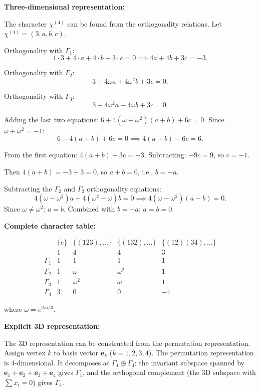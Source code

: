 \documentclass[12pt]{article}
\begin{document}
\medskip
\noindent\textbf{Three-dimensional representation:}

The character $\chi^{(4)}$ can be found from the orthogonality relations. Let $\chi^{(4)} = (3, a, b, c)$.

Orthogonality with $\Gamma_1$:
\[
1\cdot 3 + 4\cdot a + 4\cdot b + 3\cdot c = 0 \implies 4a + 4b + 3c = -3.
\]

Orthogonality with $\Gamma_2$:
\[
3 + 4\omega a + 4\omega^2 b + 3c = 0.
\]

Orthogonality with $\Gamma_3$:
\[
3 + 4\omega^2 a + 4\omega b + 3c = 0.
\]

Adding the last two equations: $6 + 4(\omega + \omega^2)(a + b) + 6c = 0$. Since $\omega + \omega^2 = -1$:
\[
6 - 4(a + b) + 6c = 0 \implies 4(a+b) - 6c = 6.
\]

From the first equation: $4(a+b) + 3c = -3$. Subtracting: $-9c = 9$, so $c = -1$.

Then $4(a+b) = -3 + 3 = 0$, so $a + b = 0$, i.e., $b = -a$.

Subtracting the $\Gamma_2$ and $\Gamma_3$ orthogonality equations:
\[
4(\omega - \omega^2)a + 4(\omega^2 - \omega)b = 0 \implies 4(\omega - \omega^2)(a - b) = 0.
\]
Since $\omega \neq \omega^2$: $a = b$. Combined with $b = -a$: $a = b = 0$.

\medskip
\noindent\textbf{Complete character table:}

\[
\begin{array}{c|cccc}
 & \{e\} & \{(123),\ldots\} & \{(132),\ldots\} & \{(12)(34),\ldots\} \\
 & 1 & 4 & 4 & 3 \\
\hline
\Gamma_1 & 1 & 1 & 1 & 1 \\
\Gamma_2 & 1 & \omega & \omega^2 & 1 \\
\Gamma_3 & 1 & \omega^2 & \omega & 1 \\
\Gamma_4 & 3 & 0 & 0 & -1
\end{array}
\]

where $\omega = e^{2\pi i/3}$.

\medskip
\noindent\textbf{Explicit 3D representation:}

The 3D representation can be constructed from the permutation representation. Assign vertex $k$ to basis vector $\mathbf{e}_k$ ($k = 1,2,3,4$). The permutation representation is 4-dimensional. It decomposes as $\Gamma_1 \oplus \Gamma_4$: the invariant subspace spanned by $\mathbf{e}_1 + \mathbf{e}_2 + \mathbf{e}_3 + \mathbf{e}_4$ gives $\Gamma_1$, and the orthogonal complement (the 3D subspace with $\sum x_i = 0$) gives $\Gamma_4$.
\end{document}

